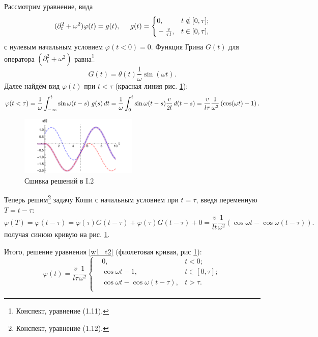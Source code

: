 Рассмотрим уравнение, вида
\begin{equation*}
    (\partial_t^2 + \omega^2) \varphi(t) = g(t),
    \hspace{5 mm}   
    g(t) = \left\{\begin{aligned}
        &0, &t\notin [0, \tau]; \\
        &- \tfrac{v}{\tau l}, &t \in [0, \tau], \\
    \end{aligned}\right.
    \label{w1_t2}
\end{equation*}
с нулевым начальным условием $\varphi(t<0)=0$.
Функция Грина $G(t)$ для оператора $(\partial_t^2 + \omega^2)$ равна\footnote{
    Конспект, уравнение (1.11).
} 
\begin{equation*}
    G(t) = \theta(t) \frac{1}{\omega} \sin(\omega t).
\end{equation*}
Далее найдём вид $\varphi(t)$ при $t < \tau$ (красная линия рис. \ref{fig:I2}):
\begin{equation*}
    \varphi(t < \tau) = \frac{1}{\omega} \int_{-\infty}^{t} \sin \omega(t-s) \ g(s) \, d t = \frac{1}{\omega} \int_0^t \sin \omega(t-s) \frac{v}{2l} \, d (t-s) = 
    \frac{v}{l \tau} \frac{1}{\omega^2} \left(
        \cos(\omega t) - 1
    \right).
\end{equation*}

\begin{figure}[ht]
    \centering
    \includegraphics[width=0.5\textwidth]{figures/T2.pdf}
    \caption{Сшивка решений в I.2}
    \label{fig:I2}
\end{figure}

Теперь решим\footnote{
    Конспект, уравнение (1.12).
}  задачу Коши с начальным условием при $t = \tau$, введя переменную $T = t-\tau$:
\begin{equation*}
    \varphi(T) = \varphi(t-\tau) = \dot{\varphi}(\tau) G(t-\tau) + \varphi(\tau) \dot{G}(t-\tau) + 0 = 
    \frac{v}{lt} \frac{1}{\omega^2} \left(
        \cos \omega t - \cos \omega(t-\tau)
    \right).
\end{equation*}
 получая синюю кривую на рис. \ref{fig:I2}.

 Итого, решение уравнения \eqref{w1_t2} (фиолетовая кривая, рис \ref{fig:I2}):
 \begin{equation*}
     \varphi(t) = \frac{v}{l \tau} \frac{1}{\omega^2}\left\{\begin{aligned}
        &0
        , &t < 0; \\
        & \cos \omega t - 1
        , &t \in [0, \tau]; \\
        & \cos \omega t - \cos \omega(t-\tau)
        , &t > \tau. \\
     \end{aligned}\right.
 \end{equation*}


